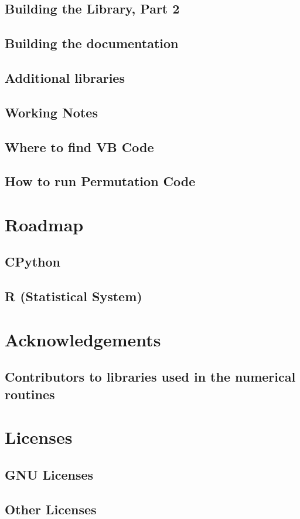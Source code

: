 \documentclass[12pt,a4paper,openany]{book}
\begin{document}
\section{Building the Library, Part 2}

\section{Building the documentation}

\section{Additional libraries}

\section{Working Notes}

\section{Where to find VB Code}

\section{How to run Permutation Code}

\chapter{Roadmap}

\section{CPython}

\section{R (Statistical System)}

\chapter{Acknowledgements}

\section{Contributors to libraries used in the numerical routines}

\chapter{Licenses}

\section{GNU Licenses}

\section{Other Licenses}

\chapter{\tocbibname }
\end{document}

